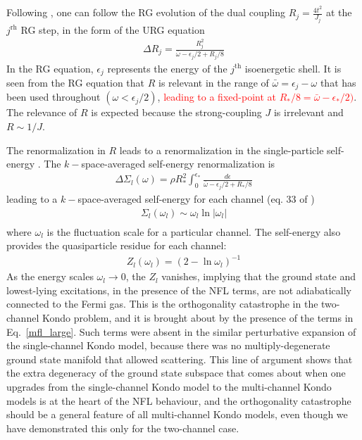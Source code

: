 \documentclass{revtex4-2}
\begin{document}
Following \cite{anirbanmott1}, one can follow the RG evolution of the dual coupling \(R_j = \frac{4t^2}{J_j}\) at the \(j^\text{rh}\) RG step, in the form of the URG equation
\begin{equation}\begin{aligned}
	\Delta R_j = \frac{R_j^2}{\bar\omega - \epsilon_{j}/2 + R_j/8}
\end{aligned}\end{equation}
In the RG equation, \(\epsilon_{j}\) represents the energy of the \(j^\text{th}\) isoenergetic shell. It is seen from the RG equation that \(R\) is relevant in the range of \(\bar\omega = \epsilon_j -\omega\) that has been used throughout \((\omega < \epsilon_j/2)\), \textcolor{red}{leading to a fixed-point at \(R_*/8 = \bar\omega - \epsilon_*/2)\)}. The relevance of \(R\) is expected because the strong-coupling \(J\) is irrelevant and \(R \sim 1/J\).

The renormalization in \(R\) leads to a renormalization in the single-particle self-energy \cite{anirbanmott1}. The \(k-\)space-averaged self-energy renormalization is
\begin{equation}\begin{aligned}
	\Delta \Sigma_l(\omega) = \rho R_*^2\int_0^{\epsilon_*} \frac{d\epsilon}{\bar\omega - \epsilon_j/2 + R_*/8}
\end{aligned}\end{equation}
leading to a \(k-\)space-averaged self-energy for each channel (eq. 33 of \cite{anirbanmott1})
\begin{equation}\begin{aligned}
	\label{self_energy}
	\Sigma_l(\omega_l) \sim \omega_l \ln |\omega_l|\\
\end{aligned}\end{equation}
where \(\omega_l\) is the fluctuation scale for a particular channel. The self-energy also provides the quasiparticle residue for each channel\cite{anirbanmott1}:
\begin{equation}\begin{aligned}
	Z_l(\omega_l) = \left(2 - \ln \omega_l\right) ^{-1}
\end{aligned}\end{equation}
As the energy scales \(\omega_l \to 0\), the \(Z_l\) vanishes, implying that the ground state and lowest-lying excitations, in the presence of the NFL terms, are not adiabatically connected to the Fermi gas. This is the orthogonality catastrophe in the two-channel Kondo problem, and it is brought about by the presence of the terms in Eq.~\ref{mfl_large}. Such terms were absent in the similar perturbative expansion of the single-channel Kondo model, because there was no multiply-degenerate ground state manifold that allowed scattering. This line of argument shows that the extra degeneracy of the ground state subspace that comes about when one upgrades from the single-channel Kondo model to the multi-channel Kondo models is at the heart of the NFL behaviour, and the orthogonality catastrophe should be a general feature of all multi-channel Kondo models, even though we have demonstrated this only for the two-channel case.
\end{document}
